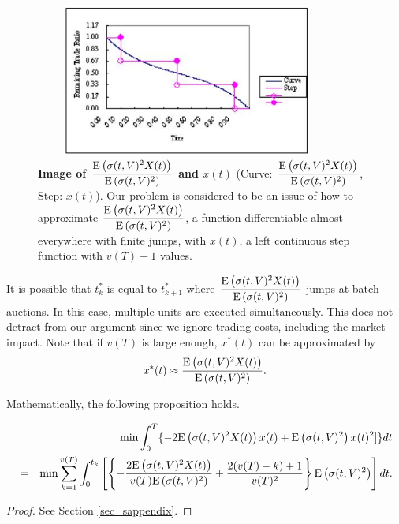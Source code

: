\begin{figure}[htbp]
\begin{center}
 \includegraphics[width=10cm,height=5cm]{fg_s1n.png}
\end{center}
\caption[Image of $\displaystyle \frac{\ex{\sigma(t,V)^2X(t)}}{\ex{\sigma(t,V)^2}}$ and $x(t)$]
{{\bf Image of $\displaystyle \frac{\ex{\sigma(t,V)^2X(t)}}{\ex{\sigma(t,V)^2}}$ and $x(t)$} (Curve:
$\displaystyle \frac{\ex{\sigma(t,V)^2X(t)}}{\ex{\sigma(t,V)^2}}$, Step: $x(t)$).
 \quad Our problem is considered to be an issue of how to approximate
$\displaystyle \frac{\ex{\sigma(t,V)^2X(t)}}{\ex{\sigma(t,V)^2}}$, a function differentiable almost everywhere with
finite jumps, with $x(t)$, a left continuous step function with $v(T)+1$ values.}\label{fg_s1}
\end{figure}

It is possible that $t_k^*$ is equal to $t_{k+1}^*$ where $\displaystyle \frac{\ex{\sigma(t,V)^2X(t)}}{\ex{\sigma(t,V)^2}}$ jumps at batch auctions.  In this case, multiple units are executed simultaneously.  This does not detract from our argument since we ignore trading costs, including the market impact.  Note that if $v(T)$ is large enough, $x^*(t)$ can be approximated by
\[
\displaystyle x^*(t) \approx \frac{{\mathrm{E}}\left( \sigma(t,V)^2X(t) \right)}{{\mathrm{E}}\left( \sigma(t,V)^2 \right)}.
\]

Mathematically, the following proposition holds.

\begin{proposition}\label{prop_s2}
\begin{eqnarray}
    &   & \min\int_0^T \{-2{\mathrm{E}}\left( \sigma(t,V)^2X(t) \right)x(t)+ {\mathrm{E}}\left( \sigma(t,V)^2 \right)x(t)^2]\}dt\nonumber \\
    & = & \min \sum_{k=1}^{v(T)} \int_0^{t_k} \left[ \left\{ -\frac{2{\mathrm{E}}\left( \sigma(t,V)^2X(t) \right)}{v(T){\mathrm{E}}\left( \sigma(t,V)^2 \right)}+\frac{2(v(T)-k)+1}{v(T)^2}\right\}{\mathrm{E}}\left( \sigma(t,V)^2 \right)\right]dt. \label{eq_s5}
\end{eqnarray}
\end{proposition}

\begin{proof}
  See Section \ref{sec_sappendix}.
\end{proof}

